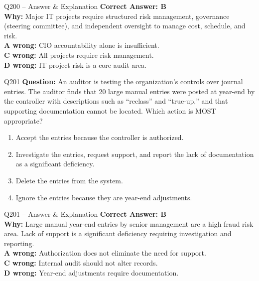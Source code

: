 \documentclass[aspectratio=169,10pt]{beamer}
\begin{document}
	\begin{frame}[t]{Q200 -- Answer \& Explanation}
		\small
		\textbf{Correct Answer: B} \\[4pt]
		\textbf{Why:} Major IT projects require structured risk management, governance (steering committee), and independent oversight to manage cost, schedule, and risk. \\[4pt]
		\textbf{A wrong:} CIO accountability alone is insufficient. \\[2pt]
		\textbf{C wrong:} All projects require risk management. \\[2pt]
		\textbf{D wrong:} IT project risk is a core audit area.
	\end{frame}
	
	\begin{frame}[t]{Q201}
		\small
		\textbf{Question:} An auditor is testing the organization's controls over journal entries. The auditor finds that 20 large manual entries were posted at year-end by the controller with descriptions such as ``reclass'' and ``true-up,'' and that supporting documentation cannot be located. Which action is MOST appropriate?
		\begin{enumerate}[label=\Alph*.,itemsep=1pt,topsep=2pt]
			\item Accept the entries because the controller is authorized.
			\item Investigate the entries, request support, and report the lack of documentation as a significant deficiency.
			\item Delete the entries from the system.
			\item Ignore the entries because they are year-end adjustments.
		\end{enumerate}
	\end{frame}
	
	\begin{frame}[t]{Q201 -- Answer \& Explanation}
		\small
		\textbf{Correct Answer: B} \\[4pt]
		\textbf{Why:} Large manual year-end entries by senior management are a high fraud risk area. Lack of support is a significant deficiency requiring investigation and reporting. \\[4pt]
		\textbf{A wrong:} Authorization does not eliminate the need for support. \\[2pt]
		\textbf{C wrong:} Internal audit should not alter records. \\[2pt]
		\textbf{D wrong:} Year-end adjustments require documentation.
	\end{frame}
	
\end{document}
